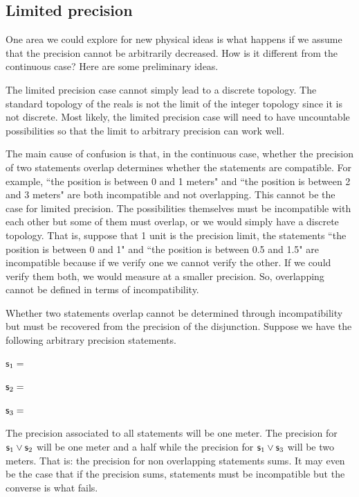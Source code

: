 \documentclass[11pt,letterpaper,fleqn]{memoir} %
\begin{document}
\subsection{Limited precision}

One area we could explore for new physical ideas is what happens if we assume that the precision cannot be arbitrarily decreased. How is it different from the continuous case? Here are some preliminary ideas.

The limited precision case cannot simply lead to a discrete topology. The standard topology of the reals is not the limit of the integer topology since it is not discrete. Most likely, the limited precision case will need to have uncountable possibilities so that the limit to arbitrary precision can work well.

The main cause of confusion is that, in the continuous case, whether the precision of two statements overlap determines whether the statements are compatible. For example, ``the position is between 0 and 1 meters" and ``the position is between 2 and 3 meters" are both incompatible and not overlapping. This cannot be the case for limited precision. The possibilities themselves must be incompatible with each other but some of them must overlap, or we would simply have a discrete topology. That is, suppose that 1 unit is the precision limit, the statements ``the position is between 0 and 1" and ``the position is between 0.5 and 1.5" are incompatible because if we verify one we cannot verify the other. If we could verify them both, we would measure at a smaller precision. So, overlapping cannot be defined in terms of incompatibility.

Whether two statements overlap cannot be determined through incompatibility but must be recovered from the precision of the disjunction. Suppose we have the following arbitrary precision statements.
\begin{description}
	\item $\mathsf{s}_1=$
	\item $\mathsf{s}_2=$
	\item $\mathsf{s}_3=$
\end{description}
The precision associated to all statements will be one meter. The precision for $\mathsf{s}_1\vee\mathsf{s}_2$ will be one meter and a half while the precision for $\mathsf{s}_1\vee\mathsf{s}_3$ will be two meters. That is: the precision for non overlapping statements sums. It may even be the case that if the precision sums, statements must be incompatible but the converse is what fails.
\end{document}

